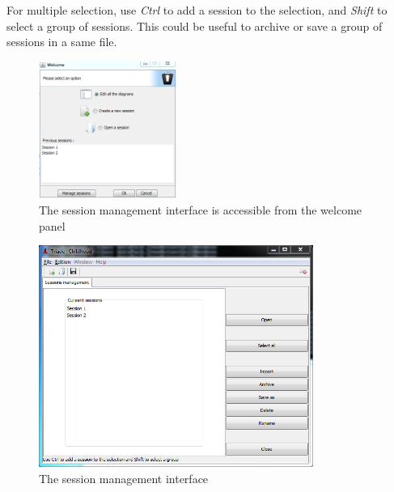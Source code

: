 For multiple selection, use \textit{Ctrl} to add a session to the selection, and \textit{Shift} to select a group of sessions. This could be useful to archive or save a group of sessions in a same file.\\

\begin{figure}[h!]
\centering
\includegraphics[width=0.4\textwidth]{../images/ouverture_session.png}
\caption{The session management interface is accessible from the welcome panel}
\end{figure}

\begin{figure}[h!]
\centering
\includegraphics[width=0.8\textwidth]{../images/gestion_session.png}
\caption{The session management interface}
\end{figure}

